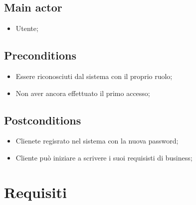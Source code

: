 \documentclass{article}
\begin{document}
    \subsection*{Main actor}
        \begin{itemize}
            \item Utente;
        \end{itemize}
        
    \subsection*{Preconditions}
        \begin{itemize}
            \item Essere riconosciuti dal sistema con il proprio ruolo;
            \item Non aver ancora effettuato il primo accesso;
        \end{itemize}
        
    \subsection*{Postconditions}
        \begin{itemize}
            \item Clienete regisrato nel sistema con la nuova password;
            \item Cliente può iniziare a scrivere i suoi requisisti di business;
        \end{itemize}

\newpage
\section{Requisiti}
\end{document}

